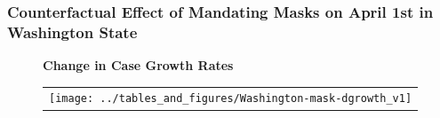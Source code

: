 \documentclass{beamer}
\begin{document}
\begin{frame}
  \frametitle{Counterfactual Effect of Mandating Masks on April 1st in Washington State}


\begin{figure}[ht]
  \begin{minipage}{\linewidth}
    \centering
    \textbf{Change in Case Growth Rates}\\ \bigskip
    \begin{tabular}{c}
      \texttt{[image: ../tables\_and\_figures/Washington-mask-dgrowth\_v1]}
    \end{tabular}
  \end{minipage}
\end{figure}
 


\end{frame}

\end{document}
